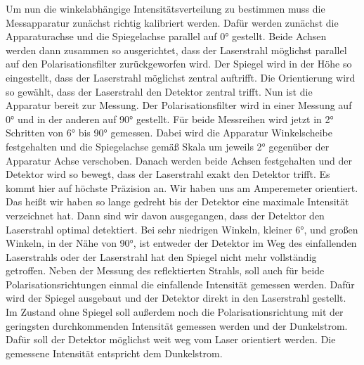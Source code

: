 \noindent Um nun die winkelabhängige Intensitätsverteilung zu bestimmen muss die Messapparatur zunächst richtig kalibriert werden.
Dafür werden zunächst die Apparaturachse und die Spiegelachse parallel auf 0° gestellt. Beide Achsen werden dann zusammen so ausgerichtet, dass der Laserstrahl möglichst
parallel auf den Polarisationsfilter zurückgeworfen wird. Der Spiegel wird in der Höhe so eingestellt, dass der Laserstrahl möglichst zentral auftrifft. Die Orientierung wird so gewählt, dass der Laserstrahl den Detektor zentral trifft.
Nun ist die Apparatur bereit zur Messung. Der Polarisationsfilter wird in einer Messung auf 0° und in der anderen auf 90° gestellt.
Für beide Messreihen wird jetzt in 2° Schritten von 6° bis 90° gemessen. Dabei wird die Apparatur Winkelscheibe festgehalten und
die Spiegelachse gemäß Skala um jeweils 2° gegenüber der Apparatur Achse verschoben. Danach werden beide Achsen festgehalten und der 
Detektor wird so bewegt, dass der Laserstrahl exakt den Detektor trifft. Es kommt hier auf höchste Präzision an. Wir haben uns am Amperemeter orientiert. Das heißt wir haben so lange gedreht
bis der Detektor eine maximale Intensität verzeichnet hat. Dann sind wir davon ausgegangen, dass der Detektor den Laserstrahl optimal detektiert.
Bei sehr niedrigen Winkeln, kleiner 6°, und großen Winkeln, in der Nähe von 90°, ist entweder der Detektor im Weg des einfallenden Laserstrahls oder der Laserstrahl
hat den Spiegel nicht mehr vollständig getroffen. Neben der Messung des reflektierten Strahls, soll auch für beide Polarisationsrichtungen einmal die einfallende Intensität gemessen werden.
Dafür wird der Spiegel ausgebaut und der Detektor direkt in den Laserstrahl gestellt. Im Zustand ohne Spiegel soll außerdem noch die Polarisationsrichtung 
mit der geringsten durchkommenden Intensität gemessen werden und der Dunkelstrom. Dafür soll der Detektor möglichst weit weg vom Laser orientiert werden. Die gemessene Intensität 
entspricht dem Dunkelstrom.